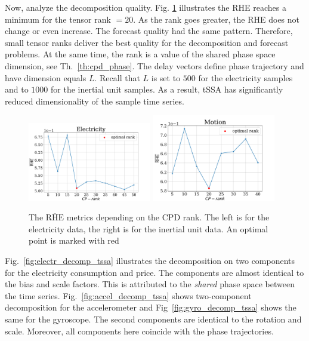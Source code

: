 \documentclass[referee, pdflatex, sn-mathphys-num]{sn-jnl}
\theoremstyle{definition}
\theoremstyle{plain}
\begin{document}
	Now, analyze the decomposition quality. Fig. \ref{fig:decomp_rhe_rank} illustrates the RHE reaches a minimum for the tensor rank $ = 20 $. As the rank goes greater, the RHE does not change or even increase. The forecast quality had the same pattern. Therefore, small tensor ranks deliver the best quality for the decomposition and forecast problems. At the same time, the rank is a value of the shared phase space dimension, see Th.~\ref{th:cpd_phase}. The delay vectors define phase trajectory and have dimension equals $ L $. Recall that $ L $ is set to $ 500 $ for the electricity samples and to $ 1000 $ for the inertial unit samples. As a result, tSSA has significantly reduced dimensionality of the sample time series.
	
	\begin{figure}[h]
		\centering
		\includegraphics[width=0.48\textwidth, keepaspectratio]{RHE_mean_elec.png}
		\includegraphics[width=0.48\textwidth, keepaspectratio]{RHE_mean_motion.png}
		\caption{The $ \overline{\text{RHE}} $ metrics depending on the CPD rank. The left is for the electricity data, the right is for the inertial unit data. An optimal point is marked with red}\label{fig:decomp_rhe_rank}
	\end{figure}
	
	Fig.~\ref{fig:electr_decomp_tssa} illustrates the decomposition on two components for the electricity consumption and price. The components are almost identical to the bias and scale factors. This is attributed to the \emph{shared} phase space between the time series. Fig.~\ref{fig:accel_decomp_tssa} shows two-component decomposition for the accelerometer and Fig~\ref{fig:gyro_decomp_tssa} shows the same for the gyroscope. The second components are identical to the rotation and scale. Moreover, all components here coincide with the phase trajectories. 
	
\end{document}
